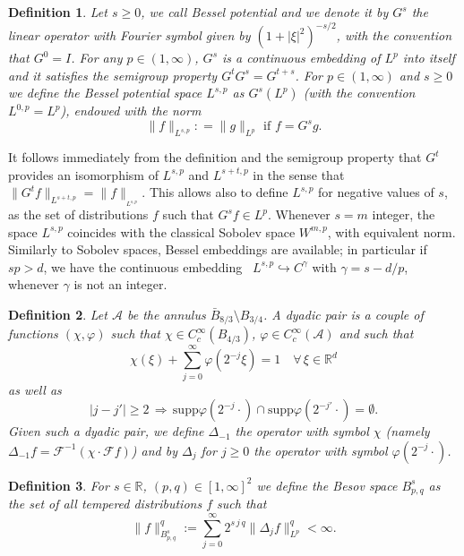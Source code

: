 \documentclass[10pt]{article}
\newcommand{\assign}{:=}
\newtheorem{definition}{Definition}
\begin{document}
\begin{definition}
  \label{appendixA2 defn bessel}Let $s \geqslant 0$, we call Bessel potential
  and we denote it by $G^s$ the linear operator with Fourier symbol given by
  $(1 + | \xi |^2)^{- s / 2}$, with the convention that $G^0 = I$. For any $p
  \in (1, \infty)$, $G^s$ is a continuous embedding of $L^p$ into itself and
  it satisfies the semigroup property $G^t G^s = G^{t + s}$. For $p \in (1,
  \infty)$ and $s \geqslant 0$ we define the Bessel potential space $L^{s, p}$
  as $G^s (L^p)$ (with the convention $L^{0, p} = L^p$), endowed with the norm
  \[ \| f \|_{L^{s, p}} : = \| g \|_{L^p}  \text{ if } f = G^s g. \]
\end{definition}

It follows immediately from the definition and the semigroup property that
$G^t$ provides an isomorphism of $L^{s, p}$ and $L^{s + t, p}$ in the sense
that $\| G^t f \|_{L^{s + t, p}} = \| f \|_{_{L^{s, p}}}$. This allows also to
define $L^{s, p}$ for negative values of $s$, as the set of distributions $f$
such that $G^s f \in L^p$. Whenever $s = m$ integer, the space $L^{s, p}$
coincides with the classical Sobolev space $W^{m, p}$, with equivalent norm.
Similarly to Sobolev spaces, Bessel embeddings are available; in particular if
$s p > d$, we have the continuous embedding \ $L^{s, p} \hookrightarrow
C^{\gamma}$ with $\gamma = s - d / p$, whenever $\gamma$ is not an integer.

\begin{definition}
  \label{appendixA2 dyadic pair}Let $\mathcal{A}$ be the annulus $\bar{B}_{8 /
  3} \setminus B_{3 / 4}$. A dyadic pair is a couple of functions $(\chi,
  \varphi)$ such that $\chi \in C^{\infty}_c (B_{4 / 3})$, $\varphi \in
  C^{\infty}_c (\mathcal{A})$ and such that
  \[ \chi (\xi) + \sum_{j = 0}^{\infty} \varphi (2^{- j} \xi) = 1 \quad
     \forall \, \xi \in \mathbb{R}^d \]
  as well as
  \[ | j - j' | \geqslant 2 \, \Rightarrow \, \text{supp} \varphi (2^{- j}
     \cdot) \cap \text{supp} \varphi (2^{- j'} \cdot) = \emptyset . \]
  Given such a dyadic pair, we define $\Delta_{- 1}$ the operator with symbol
  $\chi$ (namely $\Delta_{- 1} f = \mathcal{F}^{- 1} (\chi \cdot \mathcal{F}
  f)$) and by $\Delta_j$ for $j \geqslant 0$ the operator with symbol $\varphi
  (2^{- j} \cdot)$.
\end{definition}

\begin{definition}
  \label{appendixA2 defn besov}For $s \in \mathbb{R}$, $(p, q) \in [1,
  \infty]^2$ we define the Besov space $B^s_{p, q}$ as the set of all tempered
  distributions $f$ such that
  \[ \| f \|_{B^s_{p, q}}^q \assign \sum_{j = 0}^{\infty} 2^{s \, j \, q} \|
     \Delta_j f \|_{L^p}^q < \infty . \]
\end{definition}
\end{document}
